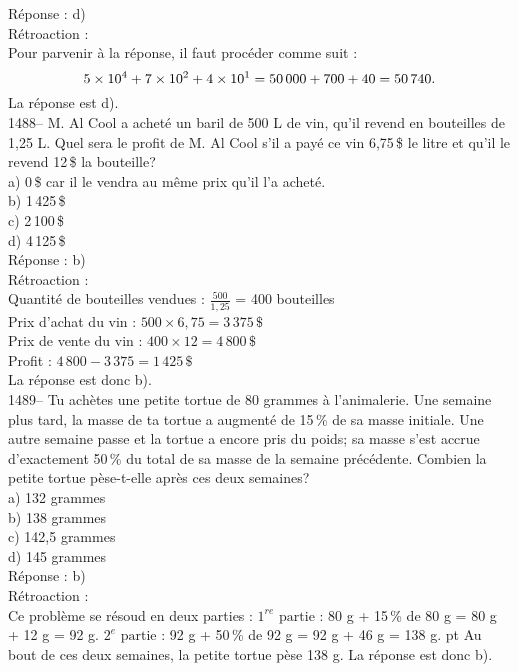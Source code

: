 R\'eponse : d)\\

R\'etroaction :\\
Pour parvenir \`a la r\'eponse, il faut proc\'eder comme suit :
$$5\times10^4 + 7\times10^2 + 4\times10^1 =\\
50\,000 + 700 + 40 =50\,740.$$ La r\'eponse est d).\\

1488-- M. Al Cool a achet\'e un baril de 500 L de vin, qu'il revend en
bouteilles de 1,25 L. Quel sera le profit de M. Al Cool s'il a
pay\'e ce vin 6,75\,\$ le litre et qu'il le revend 12\,\$ la bouteille?\\
a) 0\,\$ car il le vendra au m\^eme prix qu'il l'a achet\'e.\\
b) 1\,425\,\$\\
c) 2\,100\,\$\\
d) 4\,125\,\$\\

R\'eponse : b)\\

R\'etroaction :\\
Quantit\'e de bouteilles vendues : $\frac{500}{1,25}$ = 400 bouteilles\\

Prix d'achat du vin : $500\times6,75=3\,375\,\$$\\

Prix de vente du vin : $400\times 12=4\,800\,\$$\\

Profit : $4\,800-3\,375=1\,425\,\$$\\[3mm]
La r\'eponse est donc b).\\

1489-- Tu ach\`etes une petite tortue de 80 grammes \`a l'animalerie.
Une semaine plus tard, la masse de ta tortue a augment\'e de 15\,\%
de sa masse initiale. Une autre semaine passe et la tortue a encore
pris du poids; sa masse s'est accrue d'exactement 50\,\% du total de
sa masse de la semaine pr\'ec\'edente. Combien
la petite tortue p\`ese-t-elle apr\`es ces deux semaines?\\
a) 132 grammes\\
b) 138 grammes\\
c) 142,5 grammes\\
d) 145 grammes\\

R\'eponse : b)\\

R\'etroaction :\\
Ce probl\`eme se r\'esoud en deux parties : \vskip 10pt
$1^{re}{\textrm{ partie}}$ : 80 g + 15\,\% de 80 g = 80 g + 12 g =
92 g. \vskip 10pt $2^e{\textrm{ partie}}$ : 92 g + 50\,\% de 92 g =
92 g + 46 g = 138 g.  pt \noindent
Au bout de ces deux semaines, la petite tortue p\`ese 138 g. La r\'eponse
est donc b).\\

